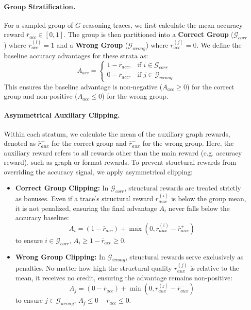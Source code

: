 \paragraph{Group Stratification.}
For a sampled group of $G$ reasoning traces, we first calculate the mean accuracy reward $\bar{r}_{acc} \in [0, 1]$. The group is then partitioned into a \textbf{Correct Group} ($\mathcal{G}_{corr}$) where $r_{acc}^{(i)}=1$ and a \textbf{Wrong Group} ($\mathcal{G}_{wrong}$) where $r_{acc}^{(j)}=0$. We define the baseline accuracy advantages for these strata as:
\begin{equation}
    A_{acc} = 
    \begin{cases} 
    1 - \bar{r}_{acc}, & \text{if } i \in \mathcal{G}_{corr} \\
    0 - \bar{r}_{acc}, & \text{if } j \in \mathcal{G}_{wrong}
    \end{cases}
\end{equation}
This ensures the baseline advantage is non-negative ($A_{acc} \ge 0$) for the correct group and non-positive ($A_{acc} \le 0$) for the wrong group.

\paragraph{Asymmetrical Auxiliary Clipping.}  
Within each stratum, we calculate the mean of the auxiliary graph rewards, denoted as $\bar{r}_{aux}^+$ for the correct group and $\bar{r}_{aux}^-$ for the wrong group. Here, the auxiliary reward refers to all rewards other than the main reward (e.g. accuracy reward), such as graph or format rewards. To prevent structural rewards from overriding the accuracy signal, we apply asymmetrical clipping:

\begin{itemize}
  
    \item \textbf{Correct Group Clipping:} In $\mathcal{G}_{corr}$, structural rewards are treated strictly as bonuses. Even if a trace's structural reward $r_{aux}^{(i)}$ is below the group mean, it is not penalized, ensuring the final advantage $A_i$ never falls below the accuracy baseline:
    \begin{equation}
        A_i = (1 - \bar{r}_{acc}) + \max(0, r_{aux}^{(i)} - \bar{r}_{aux}^+)
    \end{equation}
    to ensure $i \in \mathcal{G}_{corr}$, $A_i \ge 1 - \bar{r}_{acc} \ge 0$.

    \item \textbf{Wrong Group Clipping:} In $\mathcal{G}_{wrong}$, structural rewards serve exclusively as penalties. No matter how high the structural quality $r_{aux}^{(j)}$ is relative to the mean, it receives no credit, ensuring the advantage remains non-positive:
    \begin{equation}
        A_j = (0 - \bar{r}_{acc}) + \min(0, r_{aux}^{(j)} - \bar{r}_{aux}^-)
    \end{equation}
    to ensure $j \in \mathcal{G}_{wrong}$, $A_j \le 0 - \bar{r}_{acc} \le 0$.
\end{itemize}

